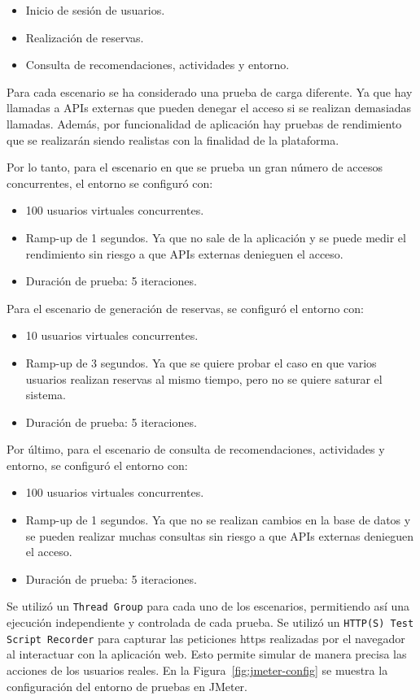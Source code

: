 \begin{itemize}
    \item Inicio de sesión de usuarios.
    \item Realización de reservas.
    \item Consulta de recomendaciones, actividades y entorno.
\end{itemize}

Para cada escenario se ha considerado una prueba de carga diferente. Ya que hay llamadas a \glspl{API} externas que pueden denegar el acceso si se realizan demasiadas llamadas. Además, por funcionalidad de aplicación hay pruebas de rendimiento que se realizarán siendo realistas con la finalidad de la plataforma. 

Por lo tanto, para el escenario en que se prueba un gran número de accesos concurrentes, el entorno se configuró con:
\begin{itemize}
    \item 100 usuarios virtuales concurrentes.
    \item Ramp-up de 1 segundos. Ya que no sale de la aplicación y se puede medir el rendimiento sin riesgo a que \glspl{API} externas denieguen el acceso.
    \item Duración de prueba: 5 iteraciones.
\end{itemize}
Para el escenario de generación de reservas, se configuró el entorno con:
\begin{itemize}
    \item 10 usuarios virtuales concurrentes.
    \item Ramp-up de 3 segundos. Ya que se quiere probar el caso en que varios usuarios realizan reservas al mismo tiempo, pero no se quiere saturar el sistema.
    \item Duración de prueba: 5 iteraciones.
\end{itemize}
Por último, para el escenario de consulta de recomendaciones, actividades y entorno, se configuró el entorno con:
\begin{itemize}
    \item 100 usuarios virtuales concurrentes.
    \item Ramp-up de 1 segundos. Ya que no se realizan cambios en la base de datos y se pueden realizar muchas consultas sin riesgo a que \glspl{API} externas denieguen el acceso.
    \item Duración de prueba: 5 iteraciones.
\end{itemize}
Se utilizó un \texttt{Thread Group} para cada uno de los escenarios, permitiendo así una ejecución independiente y controlada de cada prueba. Se utilizó un \texttt{HTTP(S) Test Script Recorder} para capturar las peticiones \gls{https} realizadas por el navegador al interactuar con la aplicación web. Esto permite simular de manera precisa las acciones de los usuarios reales. En la Figura~\ref{fig:jmeter-config} se muestra la configuración del entorno de pruebas en JMeter.
